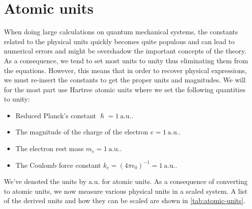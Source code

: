     \section{Atomic units}
        When doing large calculations on quantum mechanical systems, the
        constants related to the physical units quickly becomes quite populous
        and can lead to numerical errors and might be overshadow the important
        concepts of the theory.
        As a consequence, we tend to set most units to unity thus eliminating
        them from the equations.
        However, this means that in order to recover physical expressions, we
        must re-insert the constants to get the proper units and magnitudes.
        We will for the most part use Hartree atomic units \cite{hartree_1928}
        where we set the following quantities to unity:
        \begin{itemize}
            \item Reduced Planck's constant $\hslash = \SI{1}{\text{a.u.}}$.
            \item The magnitude of the charge of the electron
                $e = \SI{1}{\text{a.u.}}$.
            \item The electron rest mass $m_e = \SI{1}{\text{a.u.}}$.
            \item The Coulomb force constant
                $k_e = (4\pi \epsilon_0)^{-1} = \SI{1}{\text{a.u.}}$.
        \end{itemize}
        We've denoted the units by $\si{\text{a.u.}}$ for atomic units.
        As a consequence of converting to atomic units, we now measure various
        physical units in a scaled system.
        A list of the derived units and how they can be scaled are shown in
        \autoref{tab:atomic-units}.
